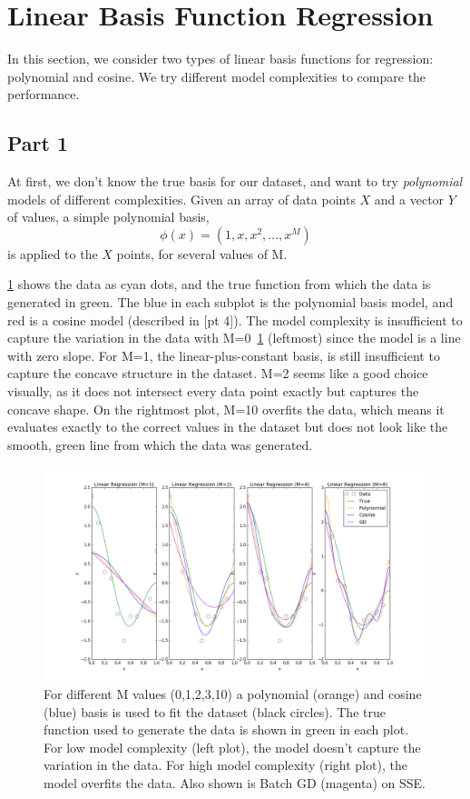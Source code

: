 \section{Linear Basis Function Regression} \label{sec:prob2}
In this section, we consider two types of linear basis functions for regression: polynomial and cosine. We try different model complexities to compare the performance.

\subsection{Part 1}
At first, we don't know the true basis for our dataset, and want to try \textit{polynomial} models of different complexities.
Given an array of data points $X$ and a vector $Y$ of values, a simple polynomial basis,
\begin{equation}
	\phi(x)=(1, x, x^2, ... , x^M)
\end{equation}
is applied to the $X$ points, for several values of M.

\cref{fig:2_3} shows the data as cyan dots, and the true function from which the data is generated in green.
The blue in each subplot is the polynomial basis model, and red is a cosine model (described in [pt 4]).
The model complexity is insufficient to capture the variation in the data with M=0~\cref{fig:2_3} (leftmost) since the model is a line with zero slope.
For M=1, the linear-plus-constant basis, is still insufficient to capture the concave structure in the dataset.
M=2 seems like a good choice visually, as it does not intersect every data point exactly but captures the concave shape.
On the rightmost plot, M=10 overfits the data, which means it evaluates exactly to the correct values in the dataset but does not look like the smooth, green line from which the data was generated.


\begin{figure}
	\centering
	\includegraphics [trim=0 0 0 0, clip, angle=0, width=0.8\columnwidth,
	keepaspectratio]{figures/2_3}
	\caption{For different M values (0,1,2,3,10) a polynomial (orange) and cosine (blue) basis is used to fit the dataset (black circles). The true function used to generate the data is shown in green in each plot. For low model complexity (left plot), the model doesn't capture the variation in the data. For high model complexity (right plot), the model overfits the data. Also shown is Batch GD (magenta) on SSE.} 
	\label{fig:2_3} 
\end{figure}

